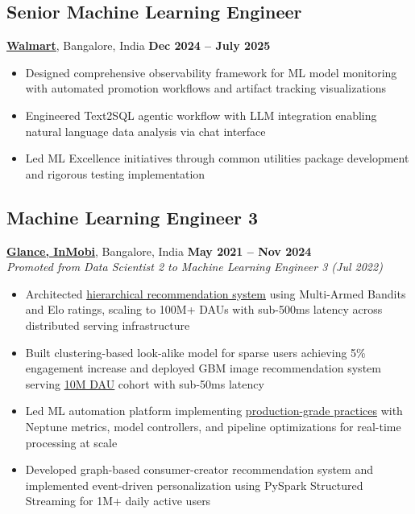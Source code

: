 \documentclass[11pt,letterpaper]{article}
\let\oldhref\href
\renewcommand{\href}[2]{\uline{\oldhref{#1}{#2}}}
\begin{document}
\subsection{Senior Machine Learning Engineer}
\noindent\textbf{\href{https://tech.walmart.com}{Walmart}}, Bangalore, India \hfill \textbf{Dec 2024 -- July 2025}
\begin{itemize}
    \item Designed comprehensive observability framework for ML model monitoring with automated promotion workflows and artifact tracking visualizations
    \item Engineered Text2SQL agentic workflow with LLM integration enabling natural language data analysis via chat interface
    \item Led ML Excellence initiatives through common utilities package development and rigorous testing implementation
\end{itemize}

\subsection{Machine Learning Engineer 3}
\noindent\textbf{\href{https://glance.com/}{Glance, InMobi}}, Bangalore, India \hfill \textbf{May 2021 -- Nov 2024} \\
\textit{Promoted from Data Scientist 2 to Machine Learning Engineer 3 (Jul 2022)}
\begin{itemize}
    \item Architected \href{https://knhash.in/blog/recommender-system-in-prod}{hierarchical recommendation system} using Multi-Armed Bandits and Elo ratings, scaling to 100M+ DAUs with sub-500ms latency across distributed serving infrastructure
    \item Built clustering-based look-alike model for sparse users achieving 5\% engagement increase and deployed GBM image recommendation system serving \href{https://knhash.in/blog/the-great-traffic-surge}{10M DAU} cohort with sub-50ms latency
    \item Led ML automation platform implementing \href{https://knhash.in/blog/let-me-help-you-please}{production-grade practices} with Neptune metrics, model controllers, and pipeline optimizations for real-time processing at scale
    \item Developed graph-based consumer-creator recommendation system and implemented event-driven personalization using PySpark Structured Streaming for 1M+ daily active users
\end{itemize}
\end{document}
